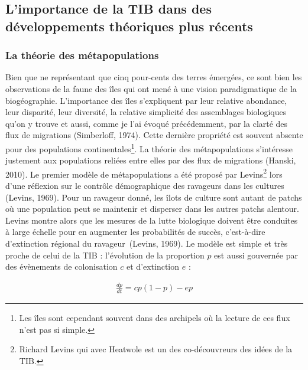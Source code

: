 \subsection*{L'importance de la TIB dans des développements théoriques
plus
récents}\label{limportance-de-la-tib-dans-des-duxe9veloppements-thuxe9oriques-plus-ruxe9cents}

\subsubsection*{La théorie des
métapopulations}\label{la-thuxe9orie-des-muxe9tapopulations}

Bien que ne représentant que cinq pour-cents des terres émergées, ce
sont bien les observations de la faune des îles qui ont mené à une
vision paradigmatique de la biogéographie. L'importance des îles
s'expliquent par leur relative abondance, leur disparité, leur
diversité, la relative simplicité des assemblages biologiques qu'on y
trouve et aussi, comme je l'ai évoqué précédemment, par la clarté des
flux de migrations (Simberloff, 1974). Cette dernière propriété est
souvent absente pour des populations continentales\footnote{Les îles
  sont cependant souvent dans des archipels où la lecture de ces flux
  n'est pas si simple.}. La théorie des métapopulations s'intéresse
justement aux populations reliées entre elles par des flux de migrations
(Hanski, 2010). Le premier modèle de métapopulations a été proposé par
Levins\footnote{Richard Levins qui avec Heatwole est un des
  co-découvreurs des idées de la TIB.} lors d'une réflexion sur le
contrôle démographique des ravageurs dans les cultures (Levins, 1969).
Pour un ravageur donné, les îlots de culture sont autant de patchs où
une population peut se maintenir et disperser dans les autres patchs
alentour. Levins montre alors que les mesures de la lutte biologique
doivent être conduites à large échelle pour en augmenter les
probabilités de succès, c'est-à-dire d'extinction régional du
ravageur~(Levins, 1969). Le modèle est simple et très proche de celui de
la TIB : l'évolution de la proportion \(p\) est aussi gouvernée par des
évènements de colonisation \(c\) et d'extinction \(e\) :

\begin{eqnarray}
\label{eqMW}
\frac{dp}{dt} = cp(1-p)-ep
\end{eqnarray}

